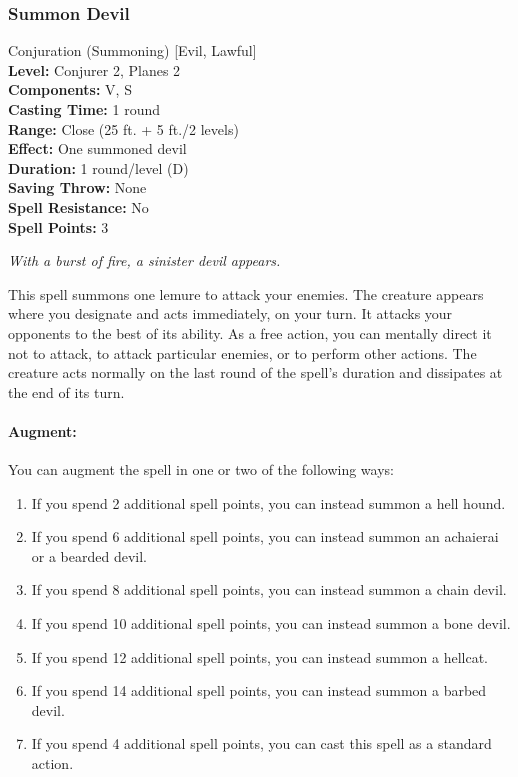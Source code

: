\subsubsection{Summon Devil}
\label{Spell:SummonDevil}
Conjuration (Summoning) [Evil, Lawful]
\\ \textbf{Level:} Conjurer 2, Planes 2
\\ \textbf{Components:} V, S
\\ \textbf{Casting Time:} 1 round
\\ \textbf{Range:} Close (25 ft. + 5 ft./2 levels)
\\ \textbf{Effect:} One summoned devil
\\ \textbf{Duration:} 1 round/level (D)
\\ \textbf{Saving Throw:} None
\\ \textbf{Spell Resistance:} No
\\ \textbf{Spell Points:} 3

\emph{With a burst of fire, a sinister devil appears.}

This spell summons one lemure to attack your enemies.
The creature appears where you designate and acts immediately, on your turn. 
It attacks your opponents to the best of its ability. 
As a free action, you can mentally direct it not to attack, to attack particular enemies, or to perform other actions. 
The creature acts normally on the last round of the spell's duration and dissipates at the end of its turn.

\paragraph{Augment:} You can augment the spell in one or two of the following ways: 
\begin{enumerate}
 \item If you spend 2 additional spell points, you can instead summon a hell hound.
 \item If you spend 6 additional spell points, you can instead summon an achaierai or a bearded devil.
 \item If you spend 8 additional spell points, you can instead summon a chain devil.
 \item If you spend 10 additional spell points, you can instead summon a bone devil.
 \item If you spend 12 additional spell points, you can instead summon a hellcat.
 \item If you spend 14 additional spell points, you can instead summon a barbed devil.
 \item If you spend 4 additional spell points, you can cast this spell as a standard action.
\end{enumerate}
